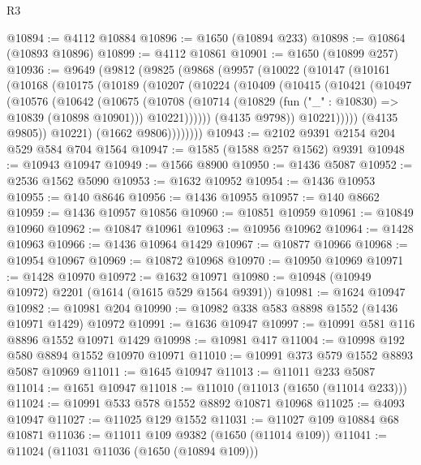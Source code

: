 \begin{lexlean}{R3}
\begin{coremodule}
@10894 := @4112 @10884
@10896 := @1650 (@10894 @233)
@10898 := @10864 (@10893 @10896)
@10899 := @4112 @10861
@10901 := @1650 (@10899 @257)
@10936 := @9649
    (@9812
      (@9825
        (@9868
          (@9957
            (@10022
              (@10147
                (@10161
                  (@10168
                    (@10175
                      (@10189
                        (@10207
                          (@10224
                            (@10409
                              (@10415
                                (@10421
                                  (@10497
                                    (@10576
                                      (@10642
                                        (@10675
                                          (@10708
                                            (@10714
                                              (@10829
                                                (fun ("_" : @10830) => @10839 (@10898 @10901)))
                                              @10221))))))
                                  (@4135 @9798))
                                @10221)))))
                      (@4135 @9805))
                    @10221)
                  (@1662 @9806))))))))
@10943 := @2102 @9391 @2154 @204 @529 @584 @704 @1564
@10947 := @1585 (@1588 @257 @1562) @9391
@10948 := @10943 @10947
@10949 := @1566 @8900
@10950 := @1436 @5087
@10952 := @2536 @1562 @5090
@10953 := @1632 @10952
@10954 := @1436 @10953
@10955 := @140 @8646
@10956 := @1436 @10955
@10957 := @140 @8662
@10959 := @1436 @10957 @10856
@10960 := @10851 @10959
@10961 := @10849 @10960
@10962 := @10847 @10961
@10963 := @10956 @10962
@10964 := @1428 @10963
@10966 := @1436 @10964 @1429
@10967 := @10877 @10966
@10968 := @10954 @10967
@10969 := @10872 @10968
@10970 := @10950 @10969
@10971 := @1428 @10970
@10972 := @1632 @10971
@10980 := @10948 (@10949 @10972) @2201 (@1614 (@1615 @529 @1564 @9391))
@10981 := @1624 @10947
@10982 := @10981 @204
@10990 := @10982 @338 @583 @8898 @1552 (@1436 @10971 @1429) @10972
@10991 := @1636 @10947
@10997 := @10991 @581 @116 @8896 @1552 @10971 @1429
@10998 := @10981 @417
@11004 := @10998 @192 @580 @8894 @1552 @10970 @10971
@11010 := @10991 @373 @579 @1552 @8893 @5087 @10969
@11011 := @1645 @10947
@11013 := @11011 @233 @5087
@11014 := @1651 @10947
@11018 := @11010 (@11013 (@1650 (@11014 @233)))
@11024 := @10991 @533 @578 @1552 @8892 @10871 @10968
@11025 := @4093 @10947
@11027 := @11025 @129 @1552
@11031 := @11027 @109 @10884 @68 @10871
@11036 := @11011 @109 @9382 (@1650 (@11014 @109))
@11041 := @11024 (@11031 @11036 (@1650 (@10894 @109)))

\end{coremodule}
\end{lexlean}
